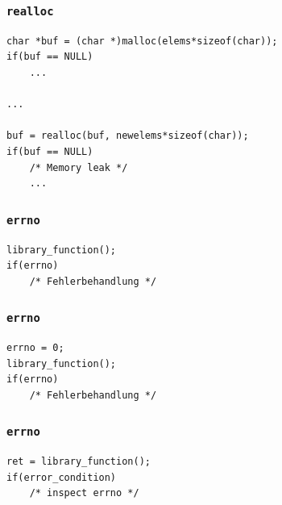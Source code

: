 \documentclass[12pt,compress]{beamer}
\begin{document}
\begin{frame}[fragile]
\frametitle{\texttt{realloc}}

\begin{lstlisting}
char *buf = (char *)malloc(elems*sizeof(char));
if(buf == NULL)
	...

...

buf = realloc(buf, newelems*sizeof(char));
if(buf == NULL)
    /* Memory leak */
    ...
\end{lstlisting}
\end{frame}




\begin{frame}[fragile]
\frametitle{\texttt{errno}}

\begin{lstlisting}
library_function();
if(errno)
    /* Fehlerbehandlung */
\end{lstlisting}
\end{frame}

\begin{frame}[fragile]
\frametitle{\texttt{errno}}

\begin{lstlisting}
errno = 0;
library_function();
if(errno)
    /* Fehlerbehandlung */
\end{lstlisting}
\end{frame}

\begin{frame}[fragile]
\frametitle{\texttt{errno}}

\begin{lstlisting}
ret = library_function();
if(error_condition)
    /* inspect errno */
\end{lstlisting}
\end{frame}
\end{document}
